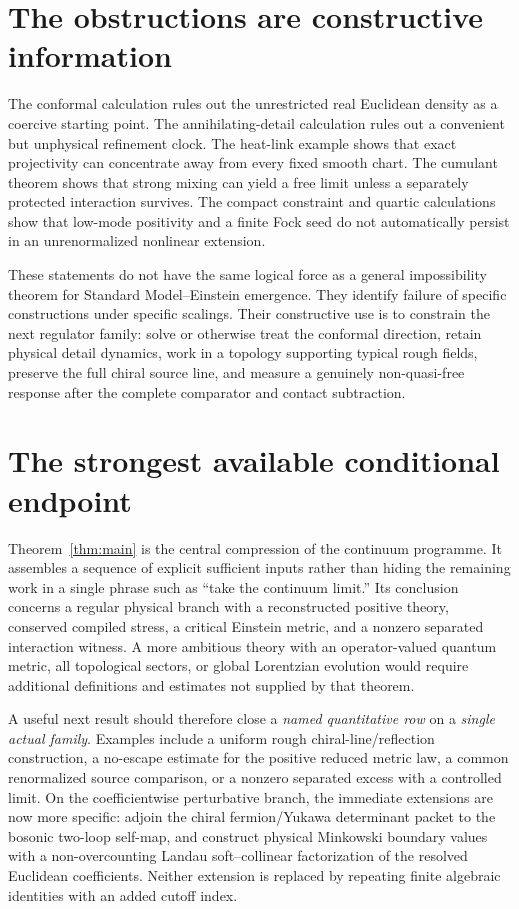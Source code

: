 \documentclass[11pt,a4paper,oneside]{book}
\theoremstyle{plain}
\theoremstyle{definition}
\theoremstyle{remark}
\begin{document}
\section{The obstructions are constructive information}
The conformal calculation rules out the unrestricted real Euclidean density as a coercive starting point. The annihilating-detail calculation rules out a convenient but unphysical refinement clock. The heat-link example shows that exact projectivity can concentrate away from every fixed smooth chart. The cumulant theorem shows that strong mixing can yield a free limit unless a separately protected interaction survives. The compact constraint and quartic calculations show that low-mode positivity and a finite Fock seed do not automatically persist in an unrenormalized nonlinear extension.

These statements do not have the same logical force as a general impossibility theorem for Standard Model--Einstein emergence. They identify failure of specific constructions under specific scalings. Their constructive use is to constrain the next regulator family: solve or otherwise treat the conformal direction, retain physical detail dynamics, work in a topology supporting typical rough fields, preserve the full chiral source line, and measure a genuinely non-quasi-free response after the complete comparator and contact subtraction.

\section{The strongest available conditional endpoint}
Theorem~\ref{thm:main} is the central compression of the continuum programme. It assembles a sequence of explicit sufficient inputs rather than hiding the remaining work in a single phrase such as ``take the continuum limit.'' Its conclusion concerns a regular physical branch with a reconstructed positive theory, conserved compiled stress, a critical Einstein metric, and a nonzero separated interaction witness. A more ambitious theory with an operator-valued quantum metric, all topological sectors, or global Lorentzian evolution would require additional definitions and estimates not supplied by that theorem.

A useful next result should therefore close a \emph{named quantitative row} on a \emph{single actual family}. Examples include a uniform rough chiral-line/reflection construction, a no-escape estimate for the positive reduced metric law, a common renormalized source comparison, or a nonzero separated excess with a controlled limit.  On the coefficientwise perturbative branch, the immediate extensions are now more specific: adjoin the chiral fermion/Yukawa determinant packet to the bosonic two-loop self-map, and construct physical Minkowski boundary values with a non-overcounting Landau soft--collinear factorization of the resolved Euclidean coefficients.  Neither extension is replaced by repeating finite algebraic identities with an added cutoff index.
\end{document}
